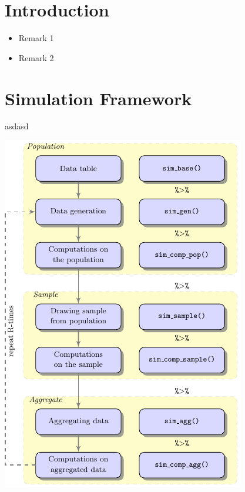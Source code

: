 \documentclass[a0,portrait]{a0poster}\usepackage[]{graphicx}\usepackage[]{color}
\newcommand{\mysec}[1]{\color{Black}\section*{#1}\color{DarkSlateGray}}
\begin{document}
\begin{multicols}{2} %


\mysec{Introduction}
\color{NavyBlue}

\begin{itemize}
  \item Remark 1
  \item Remark 2
\end{itemize}


\mysec{Simulation Framework}

\begin{multicols}{2}[\setlength{\columnseprule}{0pt}]

asdasd

\columnbreak

\includegraphics[width=\linewidth]{figs/flowdiagram}


\end{multicols}
\end{multicols}
\end{document}
